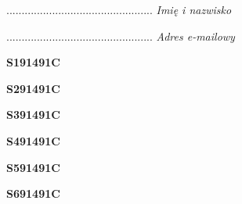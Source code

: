 \begin{turn}{90}\begin{minipage}{\linewidth} \vspace{20mm} ................................................  \textit{Imię i nazwisko}\end{minipage}\end{turn}

\begin{turn}{90}\begin{minipage}{\linewidth} \vspace{20mm} ................................................  \textit{Adres e-mailowy}\end{minipage}\end{turn}

\begin{turn}{90}\huge \begin{minipage}{\linewidth} \vspace{10mm}\textbf{S191491C}\end{minipage}\end{turn}

\begin{turn}{90}\huge \begin{minipage}{\linewidth} \vspace{10mm}\textbf{S291491C}\end{minipage}\end{turn}

\begin{turn}{90}\huge \begin{minipage}{\linewidth} \vspace{10mm}\textbf{S391491C}\end{minipage}\end{turn}

\begin{turn}{90}\huge \begin{minipage}{\linewidth} \vspace{10mm}\textbf{S491491C}\end{minipage}\end{turn}

\begin{turn}{90}\huge \begin{minipage}{\linewidth} \vspace{10mm}\textbf{S591491C}\end{minipage}\end{turn}

\begin{turn}{90}\huge \begin{minipage}{\linewidth} \vspace{10mm}\textbf{S691491C}\end{minipage}\end{turn}

